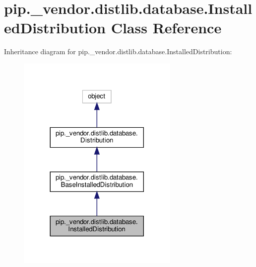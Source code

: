 \hypertarget{classpip_1_1__vendor_1_1distlib_1_1database_1_1InstalledDistribution}{}\section{pip.\+\_\+vendor.\+distlib.\+database.\+Installed\+Distribution Class Reference}
\label{classpip_1_1__vendor_1_1distlib_1_1database_1_1InstalledDistribution}


Inheritance diagram for pip.\+\_\+vendor.\+distlib.\+database.\+Installed\+Distribution\+:
\nopagebreak
\begin{figure}[H]
\begin{center}
\leavevmode
\includegraphics[width=221pt]{classpip_1_1__vendor_1_1distlib_1_1database_1_1InstalledDistribution__inherit__graph}
\end{center}
\end{figure}


